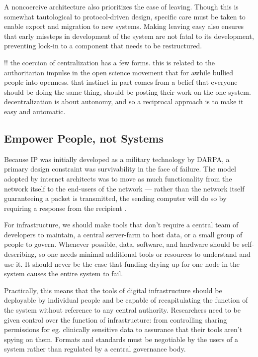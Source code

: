 \documentclass[notoc]{tufte-book}
\begin{document}
A noncoercive architecture also prioritizes the ease of leaving. Though
this is somewhat tautological to protocol-driven design, specific care
must be taken to enable export and migration to new systems. Making
leaving easy also ensures that early missteps in development of the
system are not fatal to its development, preventing lock-in to a
component that needs to be restructured.

!! the coercion of centralization has a few forms. this is related to
the authoritarian impulse in the open science movement that for awhile
bullied people into openness. that instinct in part comes from a belief
that everyone should be doing the same thing, should be posting their
work on the one system. decentralization is about autonomy, and so a
reciprocal approach is to make it easy and automatic.


\subsection{Empower People, not
Systems}

Because IP was initially developed as a military technology by DARPA, a
primary design constraint was survivability in the face of failure. The
model adopted by internet architects was to move as much functionality
from the network itself to the end-users of the network --- rather than
the network itself guaranteeing a packet is transmitted, the sending
computer will do so by requiring a response from the recipient \citep{clarkDesignPhilosophyDARPA1988} .

For infrastructure, we should make tools that don't require a central
team of developers to maintain, a central server-farm to host data, or a
small group of people to govern. Whenever possible, data, software, and
hardware should be self-describing, so one needs minimal additional
tools or resources to understand and use it. It should never be the case
that funding drying up for one node in the system causes the entire
system to fail.

Practically, this means that the tools of digital infrastructure should
be deployable by individual people and be capable of recapitulating the
function of the system without reference to any central authority.
Researchers need to be given control over the function of
infrastructure: from controlling sharing permissions for eg. clinically
sensitive data to assurance that their tools aren't spying on them.
Formats and standards must be negotiable by the users of a system rather
than regulated by a central governance body.
\end{document}
